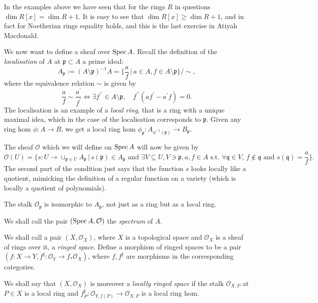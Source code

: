 \documentclass[000-main.tex]{subfiles}
\begin{document}
\begin{remark}
	In the examples above we have seen that for the rings $R$ in questions $\dim R[x] = \dim R + 1$. It is easy to see that $\dim R[x] \geq \dim R + 1$, and in fact for Noetherian rings equality holds, and this is the last exercise in Atiyah Macdonald. 
\end{remark}

We now want to define a sheaf over $\operatorname{Spec} A$. Recall the definition of the \emph{localisation} of $A$ at $\mathfrak{p} \subset A$ a prime ideal:
\[
A_{\mathfrak{p}} := (A\setminus \mathfrak{p})^{-1} A = \lbrace \frac{a}{f} \, | \, a \in A, f \in A\setminus \mathfrak{p} \rbrace / \sim,
\]
where the equivalence relation $\sim$ is given by 
\[
\frac{a}{f} \sim \frac{a^\prime}{f^\prime} \Leftrightarrow \exists f^{\prime \prime} \in A\setminus \mathfrak{p} , \quad f^{\prime \prime}(a f^\prime - a^\prime f) = 0. 
\]
The localisation is an example of a \emph{local ring}, that is a ring with a unique maximal idea, which in the case of the localisation corresponds to $\mathfrak{p}$. Given any ring hom $\phi : A \to B$, we get a local ring hom $\phi_{\mathfrak{p}} : A_{\phi^{-1}(\mathfrak{p})} \to B_{\mathfrak{p}}$. 


The sheaf $\mathcal{O}$ which we will define on $\operatorname{Spec} A$ will now be given by 
\[
\mathcal{O}(U) = \lbrace s : U \to \sqcup_{\mathfrak{p} \in U} A_{\mathfrak{p}} \, | \, s(\mathfrak{p}) \in A_{\mathfrak{p}} \text{ and } \exists V \subseteq U, V \ni \mathfrak{p}, a, f \in A \text{ s.t. } \forall \mathfrak{q} \in V, \, f \notin \mathfrak{q} \text{ and } s(\mathfrak{q}) = \frac{a}{f} \rbrace.  
\]
The second part of the condition just says that the function $s$ looks locally like a quotient, mimicking the definition of a regular function on a variety (which is locally a quotient of polynomials). 

\begin{lemma}
	The stalk $\mathcal{O}_{\mathfrak{p}}$ is isomorphic to $A_{\mathfrak{p}}$, not just as a ring but as a local ring. 
\end{lemma}

We shall call the pair $(\operatorname{Spec} A, \mathcal{O})$ the \emph{spectrum} of $A$. 

\begin{definition}
	We shall call a pair $(X, \mathcal{O}_X)$, where $X$ is a topological space and $\mathcal{O}_X$ is a sheaf of rings over it, a \emph{ringed space}. Define a morphism of ringed spaces to be a pair $(f : X \to Y, f^\sharp : \mathcal{O}_Y \to f_\ast \mathcal{O}_X)$, where $f, f^\sharp$ are morphisms in the corresponding categories. 
	
	We shall say that $(X, \mathcal{O}_X)$ is moreover a \emph{locally ringed space} if the stalk $\mathcal{O}_{X, P}$ at $P \in X$ is a local ring and $f^\sharp_P : \mathcal{O}_{Y, f(P)} \to \mathcal{O}_{X, P}$ is a local ring hom. 
\end{definition}
\end{document}
